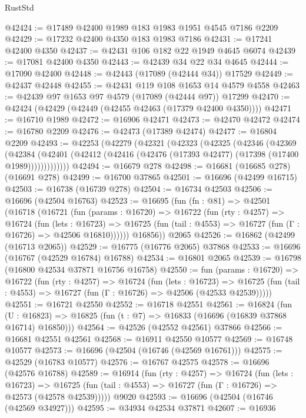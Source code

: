 \begin{lexlean}{RustStd}
\begin{coremodule}
@42424 := @17489 @42400 @1989 @183 @1983 @1951 @4545 @7186 @2209
@42429 := @17232 @42400 @4350 @183 @1983 @7186
@42431 := @17241 @42400 @4350
@42437 := @42431 @106 @182 @22 @1949 @4645 @6074
@42439 := @17081 @42400 @4350
@42443 := @42439 @34 @22 @34 @4645
@42444 := @17090 @42400
@42448 := @42443 (@17089 (@42444 @34)) @17529
@42449 := @42437 @42448
@42455 := @42431 @119 @108 @1653 @14 @4579 @4558
@42463 := @42439 @97 @1653 @97 @4579 (@17089 (@42444 @97)) @17299
@42470 := @42424 (@42429 (@42449 (@42455 @42463 (@17379 @42400 @4350))))
@42471 := @16710 @1989
@42472 := @16906 @42471
@42473 := @42470 @42472
@42474 := @16780 @2209
@42476 := @42473 (@17389 @42474)
@42477 := @16804 @2209
@42493 := @42253
    (@42279
      (@42321
        (@42323
          (@42325
            (@42346
              (@42369
                (@42384
                  (@42401 (@42412 (@42416 (@42476 (@17393 @42477) (@17398 (@17400 @1989)))))))))))))
@42494 := @16679 @278
@42498 := @16681 (@16685 @278) (@16691 @278)
@42499 := @16700 @37865
@42501 := @16696 (@42499 @16715)
@42503 := @16738 (@16739 @278)
@42504 := @16734 @42503
@42506 := @16696 (@42504 @16763)
@42523 := @16695
    (fun (fn : @81) =>
    @42501
      (@16718
        (@16721
          (fun (params : @16720) =>
          @16722
            (fun (rty : @4257) =>
            @16724
              (fun (lets : @16723) =>
              @16725 (fun (tail : @4553) => @16727 (fun (Γ : @16726) => @42506 @16810))))))
        @16856))
    @2065
@42526 := @16862 (@42499 (@16713 @2065))
@42529 := @16775 (@16776 @2065) @37868
@42533 := @16696 (@16767 (@42529 @16784) @16788)
@42534 := @16801 @2065
@42539 := @16798 (@16800 @42534 @37871 @16756 @16758)
@42550 := fun (params : @16720) =>
  @16722
    (fun (rty : @4257) =>
    @16724
      (fun (lets : @16723) =>
      @16725 (fun (tail : @4553) => @16727 (fun (Γ : @16726) => @42506 (@42533 @42539)))))
@42551 := @16721 @42550
@42552 := @16718 @42551
@42561 := @16824
    (fun (U : @16823) => @16825 (fun (t : @7) => @16833 (@16696 (@16839 @37868 @16714) @16850)))
@42564 := @42526 (@42552 @42561) @37866
@42566 := @16681 @42551 @42561
@42568 := @16911 @42550 @10577
@42569 := @16748 @10577
@42573 := @16696 (@42504 (@16746 (@42569 @16761)))
@42575 := @42529 (@16783 @10577)
@42576 := @16767 @42575
@42578 := @16696 (@42576 @16788)
@42589 := @16914
    (fun (rty : @4257) =>
    @16724
      (fun (lets : @16723) =>
      @16725 (fun (tail : @4553) => @16727 (fun (Γ : @16726) => @42573 (@42578 @42539)))))
    @9020
@42593 := @16696 (@42504 (@16746 (@42569 @34927)))
@42595 := @34934 @42534 @37871
@42607 := @16936

\end{coremodule}
\end{lexlean}
